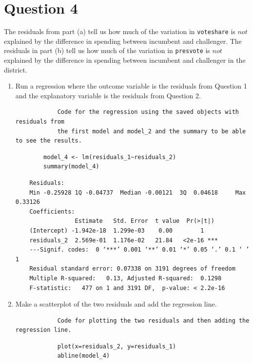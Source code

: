 \documentclass[12pt,letterpaper]{article}
\begin{document}
\section*{Question 4}
\noindent The residuals from part (a) tell us how much of the variation in \texttt{voteshare} is $not$ explained by the difference in spending between incumbent and challenger. The residuals in part (b) tell us how much of the variation in \texttt{presvote} is $not$ explained by the difference in spending between incumbent and challenger in the district.
	\begin{enumerate}
		\item Run a regression where the outcome variable is the residuals from Question 1 and the explanatory variable is the residuals from Question 2.	
		\begin{verbatim}
			Code for the regression using the saved objects with residuals from 
			the first model and model_2 and the summary to be able to see the results.
		\end{verbatim}
		\begin{lstlisting}
		model_4 <- lm(residuals_1~residuals_2)
		summary(model_4)
		\end{lstlisting}
		\begin{verbatim}
	Residuals:    
	Min -0.25928 1Q -0.04737  Median -0.00121  3Q  0.04618     Max  0.33126 
	Coefficients:             
	             Estimate   Std. Error  t value  Pr(>|t|)    
	(Intercept) -1.942e-18  1.299e-03    0.00        1    
	residuals_2  2.569e-01  1.176e-02   21.84   <2e-16 ***
	---Signif. codes:  0 ‘***’ 0.001 ‘**’ 0.01 ‘*’ 0.05 ‘.’ 0.1 ‘ ’ 1
	Residual standard error: 0.07338 on 3191 degrees of freedom
	Multiple R-squared:   0.13,	Adjusted R-squared:  0.1298 
	F-statistic:   477 on 1 and 3191 DF,  p-value: < 2.2e-16
		\end{verbatim}
		\item Make a scatterplot of the two residuals and add the regression line. 	
		\begin{verbatim}
			Code for plotting the two residuals and then adding the regression line.
		\end{verbatim}
		\begin{lstlisting}
			plot(x=residuals_2, y=residuals_1)
			abline(model_4)
			\end{lstlisting}
		\begin{figure}
			\vspace{-1cm}

\end{figure}
\end{enumerate}
\end{document}
